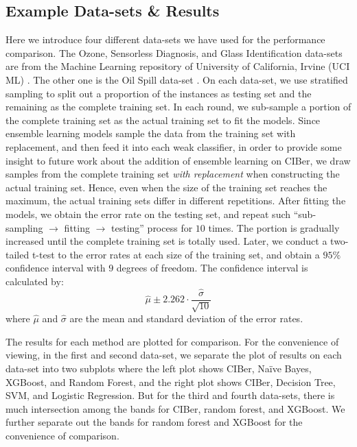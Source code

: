 \documentclass[twoside,11pt]{article}
\begin{document}
\subsection{Example Data-sets \& Results}
Here we introduce four different data-sets we have used for the performance comparison. The Ozone, Sensorless Diagnosis, and Glass Identification data-sets are from the Machine Learning repository of University of California, Irvine (UCI ML) \citep{Dua:2019}. The other one is the Oil Spill data-set \citep{kubat1998machine}. On each data-set, we use stratified sampling to split out a proportion of the instances as testing set and the remaining as the complete training set. In each round, we sub-sample a portion of the complete training set as the actual training set to fit the models. Since ensemble learning models sample the data from the training set with replacement, and then feed it into each weak classifier, in order to provide some insight to future work about the addition of ensemble learning on CIBer, we draw samples from the complete training set \textit{with replacement} when constructing the actual training set. Hence, even when the size of the training set reaches the maximum, the actual training sets differ in different repetitions. After fitting the models, we obtain the error rate on the testing set, and repeat such ``sub-sampling $\rightarrow$ fitting $\rightarrow$ testing'' process for $10$ times. The portion is gradually increased until the complete training set is totally used. Later, we conduct a two-tailed t-test to the error rates at each size of the training set, and obtain a $95\%$ confidence interval with $9$ degrees of freedom. The confidence interval is calculated by:
\begin{equation*}
    \hat{\mu}\pm2.262\cdot\frac{\hat{\sigma}}{\sqrt{10}}
\end{equation*}
where $\hat{\mu}$ and $\hat{\sigma}$ are the mean and standard deviation of the error rates.

The results for each method are plotted for comparison. For the convenience of viewing, in the first and second data-set, we separate the plot of results on each data-set into two subplots where the left plot shows CIBer, Na\"ive Bayes, XGBoost, and Random Forest, and the right plot shows CIBer, Decision Tree, SVM, and Logistic Regression. But for the third and fourth data-sets, there is much intersection among the bands for CIBer, random forest, and XGBoost. We further separate out the bands for random forest and XGBoost for the convenience of comparison. 
\end{document}

